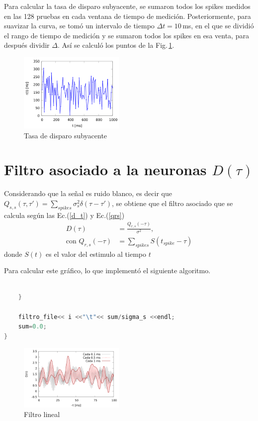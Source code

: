 Para calcular la tasa de disparo subyacente,  se sumaron todos los spikes medidos en las 128 pruebas en cada ventana de tiempo de medición. Posteriormente, para suavizar la curva, se tomó un intervalo de tiempo $\Delta t = 10\,$ms, en el que se dividió el rango de tiempo de medición y se sumaron todos los spikes en esa venta, para después dividir $\Delta$. Así se calculó los puntos de la Fig.\,\ref{r_t}.


\begin{figure}[H]
	\centering
	\includegraphics[width=0.45\textwidth]{../Graficos/r_t.png}
	\caption{Tasa de disparo subyacente}
	\label{r_t}
\end{figure}

\section*{Filtro asociado a la neuronas \texorpdfstring{$D(\tau)$}{}}


Considerando que la señal es ruido blanco, es decir que $Q_{s,s}(\tau, \tau')= \sum_{spikes} \sigma^2_s \delta(\tau-\tau')$, se obtiene que el filtro asociado que se  calcula  según las Ec.(\ref{d_t}) y Ec.(\ref{qrs}) 
\begin{align}
    D(\tau) &= \frac{Q_{r,s}(-\tau)}{\sigma^2}, \label{d_t}\\
    \text{con } Q_{r,s}(-\tau) &= \sum_{spikes} S(t_{spike} - \tau) \label{qrs}
\end{align}
donde $S(t)$ es el valor del estimulo al tiempo $t$

Para calcular este gráfico, lo que implementó  el siguiente algoritmo.

\begin{lstlisting}[language=C++]

	}
	
	filtro_file<< i <<"\t"<< sum/sigma_s <<endl;
	sum=0.0;
}
\end{lstlisting}


\begin{figure}[H]
	\centering
	\includegraphics[width=0.45\textwidth]{../Graficos/D_tau.png}
	\caption{Filtro lineal}
\end{figure}




